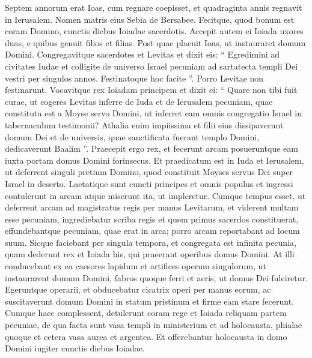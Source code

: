 \begin{biblechapter}
\begin{biblechapter}
\begin{biblechapter}
\begin{biblechapter}
\begin{biblechapter}
\begin{biblechapter}
\begin{biblechapter}
\begin{biblechapter}
\begin{biblechapter}
\begin{biblechapter}
\begin{biblechapter}
\begin{biblechapter}
\begin{biblechapter}
\begin{biblechapter}
\begin{biblechapter}
\begin{biblechapter}
\begin{biblechapter}
\begin{biblechapter}
\begin{biblechapter}
\begin{biblechapter}
\begin{biblechapter}
\begin{biblechapter}
\begin{biblechapter}
\begin{biblechapter}
\verse Septem annorum erat Ioas, cum regnare coepisset, et quadraginta annis regnavit in Ierusalem. Nomen matris eius Sebia de Bersabee. 
\verse Fecitque, quod bonum est coram Domino, cunctis diebus Ioiadae sacerdotis. 
\verse Accepit autem ei Ioiada uxores duas, e quibus genuit filios et filias.
 \verse Post quae placuit Ioas, ut instauraret domum Domini. 
\verse Congregavitque sacerdotes et Levitas et dixit eis: “ Egredimini ad civitates Iudae et colligite de universo Israel pecuniam ad sartatecta templi Dei vestri per singulos annos. Festinatoque hoc facite ”. Porro Levitae non festinarunt. 
\verse Vocavitque rex Ioiadam principem et dixit ei: “ Quare non tibi fuit curae, ut cogeres Levitas inferre de Iuda et de Ierusalem pecuniam, quae constituta est a Moyse servo Domini, ut inferret eam omnis congregatio Israel in tabernaculum testimonii? 
 \verse Athalia enim impiissima et filii eius dissipaverunt domum Dei et de universis, quae sanctificata fuerant templo Domini, dedicaverunt Baalim ”.
 \verse Praecepit ergo rex, et fecerunt arcam posueruntque eam iuxta portam domus Domini forinsecus. 
\verse Et praedicatum est in Iuda et Ierusalem, ut deferrent singuli pretium Domino, quod constituit Moyses servus Dei super Israel in deserto. 
\verse Laetatique sunt cuncti principes et omnis populus et ingressi contulerunt in arcam atque miserunt ita, ut impleretur. 
\verse Cumque tempus esset, ut deferrent arcam ad magistratus regis per manus Levitarum, et viderent multam esse pecuniam, ingrediebatur scriba regis et quem primus sacerdos constituerat, effundebantque pecuniam, quae erat in arca; porro arcam reportabant ad locum suum. Sicque faciebant per singula tempora, et congregata est infinita pecunia, 
\verse quam dederunt rex et Ioiada his, qui praeerant operibus domus Domini. At illi conducebant ex ea caesores lapidum et artifices operum singulorum, ut instaurarent domum Domini, fabros quoque ferri et aeris, ut domus Dei fulciretur. 
\verse Egeruntque operarii, et obducebatur cicatrix operi per manus eorum, ac suscitaverunt domum Domini in statum pristinum et firme eam stare fecerunt. 
\verse Cumque haec complessent, detulerunt coram rege et Ioiada reliquam partem pecuniae, de qua facta sunt vasa templi in ministerium et ad holocausta, phialae quoque et cetera vasa aurea et argentea. Et offerebantur holocausta in domo Domini iugiter cunctis diebus Ioiadae.

\end{biblechapter}
\end{biblechapter}
\end{biblechapter}
\end{biblechapter}
\end{biblechapter}
\end{biblechapter}
\end{biblechapter}
\end{biblechapter}
\end{biblechapter}
\end{biblechapter}
\end{biblechapter}
\end{biblechapter}
\end{biblechapter}
\end{biblechapter}
\end{biblechapter}
\end{biblechapter}
\end{biblechapter}
\end{biblechapter}
\end{biblechapter}
\end{biblechapter}
\end{biblechapter}
\end{biblechapter}
\end{biblechapter}
\end{biblechapter}
